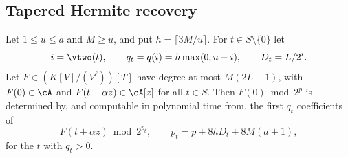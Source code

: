 \subsection{Tapered Hermite recovery}\label{app:hermite}
\begin{lemma}[Recovery]\label{lem:recovery}
Let $1\le u\le a$ and $M\ge u$, and put $h=\lceil3M/u\rceil$. For $t\in S\setminus\{0\}$
let
\[
i=\vtwo(t),\qquad q_t=q(i)=h\max(0,u-i),\qquad D_t=L/2^i .
\]
Let $F\in(K[V]/(V^\ell))[T]$ have degree at most $M(2L-1)$, with $F(0)\in\cA$ and
$F(t+\alpha z)\in\cA[z]$ for all $t\in S$. Then $F(0)\bmod2^p$ is determined by,
and computable in polynomial time from, the first $q_t$ coefficients of
\[
F(t+\alpha z)\bmod2^{p_t},\qquad p_t=p+8hD_t+8M(a+1),
\]
for the $t$ with $q_t>0$.
\end{lemma}

